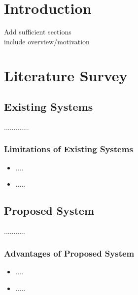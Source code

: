 \documentclass[11pt]{report}
\begin{document}
\tableofcontents


\chapter {Introduction}
\label{intro}

 
Add sufficient sections\\
include overview/motivation 

\section{}
 
 

\chapter {Literature Survey}
\label{ls}
 
\section{ Existing Systems}
.............
\subsection{Limitations of Existing Systems}
\begin{itemize}
  \item ....
  \item.....
\end{itemize}


\section{Proposed System}
 ...........
\subsection{Advantages of Proposed System}
\begin{itemize}
  \item ....
  \item .....
\end{itemize}
 
 
\end{document}
